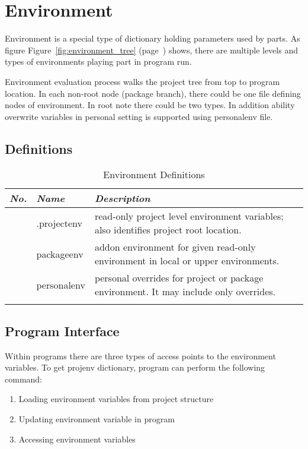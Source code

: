 \documentclass[design.tex]{subfiles}
\begin{document}
\chapter{Environment}
Environment is a special type of dictionary holding parameters used by parts. As figure Figure~\ref{fig:environment_tree} (page~\pageref{fig:environment_tree}) shows, there are multiple levels and types of environments playing part in program run.

Environment evaluation process walks the project tree from top to program location.  In each non-root node (package branch), there could be one file defining nodes of environment. In root note there could be two types. In addition ability overwrite variables in personal setting is supported using personalenv file.

\section{Definitions}
\setcounter{tablerownumbers}{0}
\begin{longtable}{|r|l|p{7cm}|}
	\hline
	\emph{No.} & \emph{Name} & \emph{Description} \\ \hline
	\rownumber & .projectenv\index{environ!.projectenv} & read-only project level environment variables; also identifies project root location. \\ \hline
	\rownumber & packageenv \index{environ!packageenv}& addon environment for given read-only environment in local or upper environments. \\ \hline
	\rownumber & personalenv \index{environ!personalenv}& personal overrides for project or package environment. It may include only overrides. \\ \hline
\caption{Environment Definitions}
\label{table:environ-defs}
\end{longtable}


\section{Program Interface}
Within programs there are three types of access points to the environment variables.
To get projenv dictionary, program can perform the following command:
\begin{enumerate}
	\item Loading environment variables from project structure
	\item Updating environment variable in program
	\item Accessing environment variables
\end{enumerate}
\end{document}
